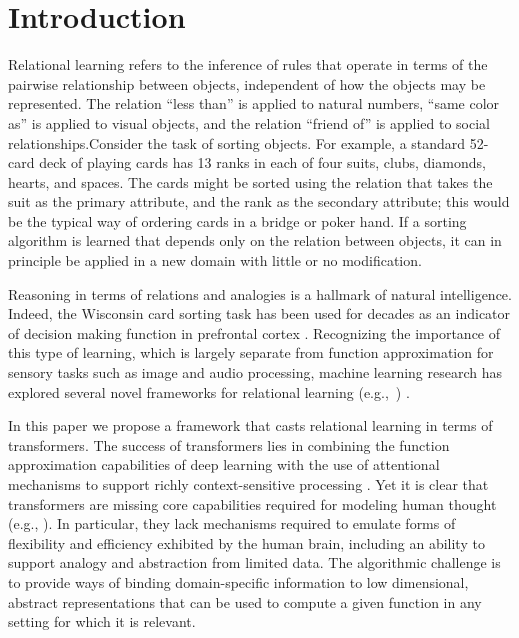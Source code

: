 \section{Introduction}
\label{sec:intro}

Relational learning refers to the inference of rules that operate in terms of the pairwise relationship between 
objects, independent of how the objects may be represented. The relation ``less than'' is applied to natural numbers, ``same color as'' is applied to visual objects, and the relation ``friend of'' is applied to social relationships.Consider the task of sorting objects. For example, a standard 52-card deck of playing cards has 13 ranks in each of four suits, clubs, diamonds, hearts, and spaces. The cards might be sorted using the relation that takes 
the suit as the primary attribute, and the rank as the secondary attribute; this would be the typical 
way of ordering cards in a bridge or poker hand. If a sorting algorithm is learned that depends 
only on the relation between objects, it can in principle be applied in a new domain with little 
or no modification. 

Reasoning in terms of relations and analogies is a hallmark of natural intelligence. 
Indeed, the Wisconsin card sorting task \citep{berg} has been used for decades as an indicator of decision making function in prefrontal cortex \cite{monchi}. Recognizing the importance of this type of learning, which is largely separate from function approximation for sensory tasks such as image and audio processing, machine learning research has explored several novel frameworks for relational learning (e.g.,~\cite{TEM, NTM,episodicControl,esbn,mondal23learned,musslick2021rationalizing}) .

In this paper we propose a framework that casts relational learning in terms of transformers. 
The success of transformers lies in combining the function approximation capabilities of deep learning with the use of attentional mechanisms to support richly context-sensitive processing \citep{transformers,vaswani2017attention,kerg2020untangling}. Yet it is clear that transformers are missing core capabilities required for modeling human thought (e.g., \cite{mahowald2023dissociating}).  In particular, they lack mechanisms required to emulate forms of flexibility and efficiency exhibited by the human brain, including an ability to support analogy and abstraction from limited data. The algorithmic challenge is to provide ways of binding domain-specific information to low dimensional, abstract representations that can be used to compute a given function in any setting for which it is relevant. 

